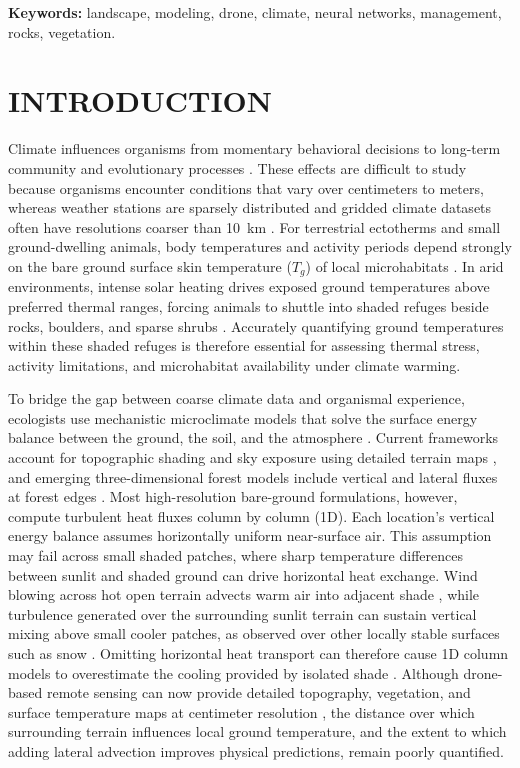 \documentclass[12pt]{article}
\begin{document}
\noindent \textbf{Keywords:} landscape, modeling, drone, climate, neural networks, management, rocks, vegetation.

\section{INTRODUCTION}

\noindent Climate influences organisms from momentary behavioral decisions to long-term community and evolutionary processes \citep{potter_2013, pincebourde_2020}. These effects are difficult to study because organisms encounter conditions that vary over centimeters to meters, whereas weather stations are sparsely distributed and gridded climate datasets often have resolutions coarser than 10~km \citep{potter_2013}. For terrestrial ectotherms and small ground-dwelling animals, body temperatures and activity periods depend strongly on the bare ground surface skin temperature ($T_g$) of local microhabitats \citep{bakken_1992, huey_1976}. In arid environments, intense solar heating drives exposed ground temperatures above preferred thermal ranges, forcing animals to shuttle into shaded refuges beside rocks, boulders, and sparse shrubs \citep{sears_2011, Stark_2023}. Accurately quantifying ground temperatures within these shaded refuges is therefore essential for assessing thermal stress, activity limitations, and microhabitat availability under climate warming.

To bridge the gap between coarse climate data and organismal experience, ecologists use mechanistic microclimate models that solve the surface energy balance between the ground, the soil, and the atmosphere \citep[e.g.,][]{campbell_1998, kearney_2017, maclean_2019, maclean_2026}. Current frameworks account for topographic shading and sky exposure using detailed terrain maps \citep{kearney_2020}, and emerging three-dimensional forest models include vertical and lateral fluxes at forest edges \citep{vandewalle_2026}. Most high-resolution bare-ground formulations, however, compute turbulent heat fluxes column by column (1D). Each location's vertical energy balance assumes horizontally uniform near-surface air. This assumption may fail across small shaded patches, where sharp temperature differences between sunlit and shaded ground can drive horizontal heat exchange. Wind blowing across hot open terrain advects warm air into adjacent shade \citep{oke_1987, campbell_1998}, while turbulence generated over the surrounding sunlit terrain can sustain vertical mixing above small cooler patches, as observed over other locally stable surfaces such as snow \citep{helgason_2012}. Omitting horizontal heat transport can therefore cause 1D column models to overestimate the cooling provided by isolated shade \citep{Itzkovitch2025}. Although drone-based remote sensing can now provide detailed topography, vegetation, and surface temperature maps at centimeter resolution \citep{duffy_2021}, the distance over which surrounding terrain influences local ground temperature, and the extent to which adding lateral advection improves physical predictions, remain poorly quantified.
\end{document}
